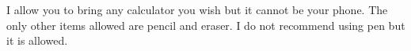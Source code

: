 I allow you to bring any calculator you wish but it cannot be your phone. The only other items allowed are pencil and eraser. I do not recommend using pen but it is allowed. 